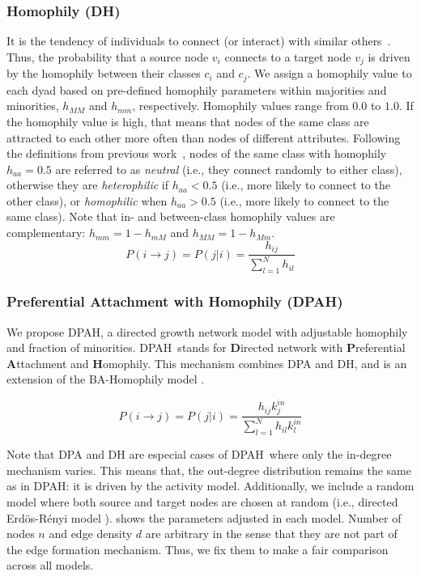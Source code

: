\documentclass[fleqn,10pt]{wlscirep}
\begin{document}
\subsubsection*{Homophily (DH)}
It is the tendency of individuals to connect (or interact) with similar others~\cite{mcpherson2001birds,newman2003structure}. 
Thus, the probability that a source node $v_i$ connects to a target node $v_j$ is driven by the homophily between their classes $c_i$ and $c_j$. 
We assign a homophily value to each dyad based on pre-defined homophily parameters within majorities and minorities, $h_{MM}$ and $h_{mm}$, respectively. Homophily values range from $0.0$ to $1.0$. If the homophily value is high, that means that nodes of the same class are attracted to each other more often than nodes of different attributes. 
Following the definitions from previous work~\cite{rogers1970homophily, karimi2018homophily, fabbri2020effect}, nodes of the same class with homophily $h_{aa}=0.5$ are referred to as \emph{neutral} (i.e., they connect randomly to either class), otherwise they are \emph{heterophilic} if $h_{aa}<0.5$ (i.e., more likely to connect to the other class), or \emph{homophilic} when $h_{aa}>0.5$ (i.e., more likely to connect to the same class). Note that in- and between-class homophily values are complementary: $h_{mm}=1-h_{mM}$ and $h_{MM}=1-h_{Mm}$. 
\begin{equation}
    P(i\to j) = P(j|i) = \frac{h_{ij}}{\sum_{l=1}^{N} h_{il}}
    \label{eq:H} 
\end{equation}

\subsubsection*{Preferential Attachment with Homophily ({DPAH})}
We propose {DPAH}, a directed growth network model with adjustable homophily and fraction of minorities. {DPAH}~stands for \textbf{D}irected network with \textbf{P}referential \textbf{A}ttachment and \textbf{H}omophily. This mechanism combines DPA and DH, and is an extension of the BA-Homophily model \cite{karimi2018homophily}.

\begin{equation}
    P(i \to j) = P(j|i) = \frac{h_{ij}k^{in}_{j}}{\sum_{l=1}^{N} h_{il} k^{in}_{l}}
    \label{eq:PAH} 
\end{equation}




Note that DPA and DH are especial cases of {DPAH}~where only the in-degree mechanism varies. This means that, the out-degree distribution remains the same as in {DPAH}: it is driven by the activity model. 
Additionally, we include a random model where both source and target nodes are chosen at random (i.e., directed Erd\"{o}s-R\'{e}nyi  model \cite{erdos1959random}).
 shows the parameters adjusted in each model. Number of nodes $n$ and edge density $d$ are arbitrary in the sense that they are not part of the edge formation mechanism. Thus, we fix them to make a fair comparison across all models.
\end{document}
